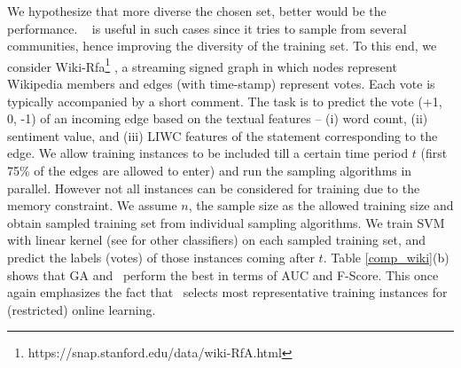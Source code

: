 We hypothesize that more diverse the chosen set, better would be the performance. \compas~ is useful in such cases since it tries to sample from several communities, hence improving the diversity of the training set. To this end, we consider Wiki-Rfa\footnote{https://snap.stanford.edu/data/wiki-RfA.html} \cite{west2014exploiting}, a streaming signed graph in which nodes represent Wikipedia members and edges (with time-stamp) represent votes. Each vote is typically accompanied by a short comment. The task is to predict the vote (+1, 0, -1) of an incoming edge based on the textual features -- (i) word count, (ii) sentiment value, and (iii) LIWC features of the statement corresponding to the edge. We allow training instances to be included till a certain time period $t$ (first 75\% of the edges are allowed to enter) and run the sampling algorithms in parallel. However not all instances can be considered for training due to the memory constraint. We assume $n$, the sample size as the allowed training size and obtain sampled training set from individual sampling algorithms. We train SVM with linear kernel (see \cite{si} for other classifiers) on each sampled training set, and predict the labels (votes) of those instances coming after $t$. Table \ref{comp_wiki}(b) shows that GA and \compas~perform the best in terms of AUC and F-Score. 
 This once again emphasizes the fact that \compas~selects most representative training instances for (restricted) online learning.
 